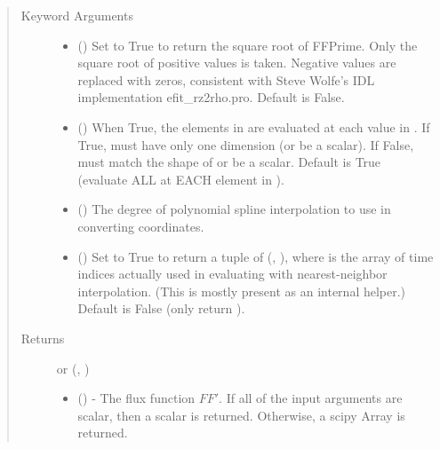 \documentclass[letterpaper,10pt,english]{sphinxmanual}
\begin{document}
\begin{fulllineitems}
\begin{fulllineitems}
\begin{quote}
\begin{description}
\begin{itemize}
\end{itemize}

\item[{Keyword Arguments}] \leavevmode\begin{itemize}
\item {} 
 () \textendash{} Set to True to return the square root of FFPrime. Only
the square root of positive values is taken. Negative values are
replaced with zeros, consistent with Steve Wolfe’s IDL
implementation efit\_rz2rho.pro. Default is False.

\item {} 
 () \textendash{} When True, the elements in  are evaluated at
each value in . If True,  must have only one dimension (or
be a scalar). If False,  must match the shape of  or be
a scalar. Default is True (evaluate ALL  at EACH element in
).

\item {} 
 () \textendash{} The degree of polynomial spline interpolation to
use in converting coordinates.

\item {} 
 () \textendash{} Set to True to return a tuple of (,
), where  is the array of time indices
actually used in evaluating  with nearest-neighbor
interpolation. (This is mostly present as an internal helper.)
Default is False (only return ).

\end{itemize}

\item[{Returns}] \leavevmode

 or (, )
\begin{itemize}
\item {} 
 () - The flux function \(FF'\).
If all of the input arguments are scalar, then a scalar is returned.
Otherwise, a scipy Array is returned.


\end{itemize}
\end{description}
\end{quote}
\end{fulllineitems}
\end{fulllineitems}
\end{document}
